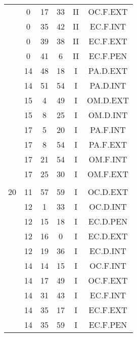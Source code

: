 \documentclass[12pt, a4paper]{article}
\begin{document}
\begin{multicols}{3}
{\begin{tabular}{c c c c c c}
	 	 	 	 & 0 & 17 & 33 & II & OC.F.EXT\\%
	 	 	 	 & 0 & 35 & 42 & II & EC.F.INT\\%
	 	 	 	 & 0 & 39 & 38 & II & EC.F.EXT\\%
	 	 	 	 & 0 & 41 & 6 & II & EC.F.PEN\\%
	 	 	 	 & 14 & 48 & 18 & I & PA.D.EXT\\%
	 	 	 	 & 14 & 51 & 54 & I & PA.D.INT\\%
	 	 	 	 & 15 & 4 & 49 & I & OM.D.EXT\\%
	 	 	 	 & 15 & 8 & 25 & I & OM.D.INT\\%
	 	 	 	 & 17 & 5 & 20 & I & PA.F.INT\\%
	 	 	 	 & 17 & 8 & 54 & I & PA.F.EXT\\%
	 	 	 	 & 17 & 21 & 54 & I & OM.F.INT\\%
	 	 	 	 & 17 & 25 & 30 & I & OM.F.EXT\\%
	 	 	 	 & & & & & \\%
	 	 	 	20 & 11 & 57 & 59 & I & OC.D.EXT\\%
	 	 	 	 & 12 & 1 & 33 & I & OC.D.INT\\%
	 	 	 	 & 12 & 15 & 18 & I & EC.D.PEN\\%
	 	 	 	 & 12 & 16 & 0 & I & EC.D.EXT\\%
	 	 	 	 & 12 & 19 & 36 & I & EC.D.INT\\%
	 	 	 	 & 14 & 14 & 15 & I & OC.F.INT\\%
	 	 	 	 & 14 & 17 & 49 & I & OC.F.EXT\\%
	 	 	 	 & 14 & 31 & 43 & I & EC.F.INT\\%
	 	 	 	 & 14 & 35 & 17 & I & EC.F.EXT\\%
	 	 	 	 & 14 & 35 & 59 & I & EC.F.PEN\\%

\end{tabular}}
\end{multicols}
\end{document}
